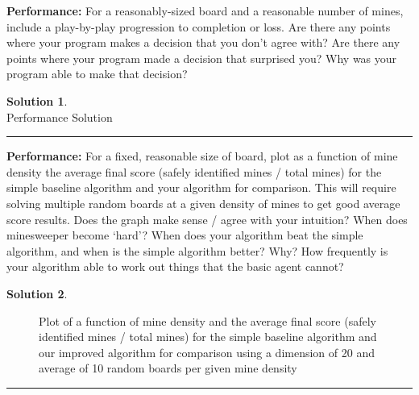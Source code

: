\documentclass{article}
\theoremstyle{definition}
\def\fline{\rule{0.75\linewidth}{0.5pt}}
\newcommand{\finishline}{\vspace{-15pt}\begin{center}\fline\end{center}}
\newtheorem*{solution*}{Solution}
\newenvironment{solution}{\begin{solution*}}{{\finishline} \end{solution*}}
\begin{document}
\smallskip

\textbf{Performance: }
	For a reasonably-sized board and a reasonable number of mines, include a play-by-play progression to completion or loss. Are there any points where your program makes a decision that you don’t agree with?
Are there any points where your program made a decision that surprised you? 
Why was your program able to make that decision? 
\begin{solution} \hfill \\
	Performance Solution
\end{solution}

\smallskip

\textbf{Performance: }
For a fixed, reasonable size of board, plot as a function of mine density the average final score (safely identified mines / total mines) for the simple baseline algorithm and your algorithm for comparison. This will require solving multiple random boards at a given density of mines to get good average score results.
Does the graph make sense / agree with your intuition? When does minesweeper become ‘hard’?
When does your algorithm beat the simple algorithm, and when is the simple algorithm better? Why?
How frequently is your algorithm able to work out things that the basic agent cannot?
\begin{solution} \hfill \\

    \begin{figure}[h]
	\centering
	\caption{Plot of a function of mine density and the average final score (safely identified mines / total mines) for the simple baseline algorithm and our improved algorithm for comparison using a dimension of 20 and average of 10 random boards per given mine density}
	\end{figure}

\end{solution}
\end{document}
